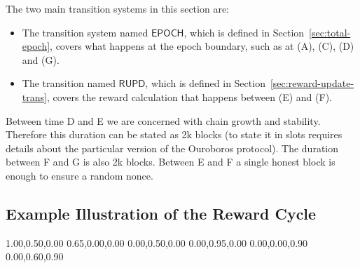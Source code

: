 The two main transition systems in this section are:
\begin{itemize}
  \item The transition system named $\mathsf{EPOCH}$, which is defined in
    Section~\ref{sec:total-epoch}, covers what happens at the epoch boundary,
    such as at (A), (C), (D) and (G).
  \item The transition named $\mathsf{RUPD}$, which is defined in
    Section~\ref{sec:reward-update-trans}, covers the reward calculation that
    happens between (E) and (F).
\end{itemize}


\begin{note}
  Between time D and E we are concerned with chain growth and stability.
  Therefore this duration can be stated as 2k blocks (to state it in slots requires details about
  the particular version of the Ouroboros protocol). The duration between F and G is also 2k blocks.
  Between E and F a single honest block is enough to ensure a random nonce.
\end{note}

\subsection{Example Illustration of the Reward Cycle}
\label{sec:illustration-reward-cycle}

\definecolor{epochColor}{rgb} {1.00,0.50,0.00}
\definecolor{aliceColor}{rgb} {0.65,0.00,0.00}
\definecolor{bobColor}{rgb} {0.00,0.50,0.00}
\definecolor{bob2Color}{rgb} {0.00,0.95,0.00}
\definecolor{snapshot1}{rgb} {0.00,0.00,0.90}
\definecolor{snapshot2}{rgb} {0.00,0.60,0.90}

